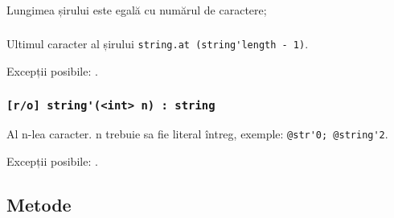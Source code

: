 \subsubsection{}

Lungimea șirului este egală cu numărul de caractere;

\subsubsection{}

Ultimul caracter al șirului \lstinline|string.at (string'length - 1)|.

Excepții posibile: .

\subsubsection{\lstinline|[r/o] string'(<int> n) : string|}

Al n-lea caracter. n trebuie sa fie literal întreg, exemple: \lstinline|@str'0; @string'2|.

Excepții posibile: .

\subsection{Metode}

